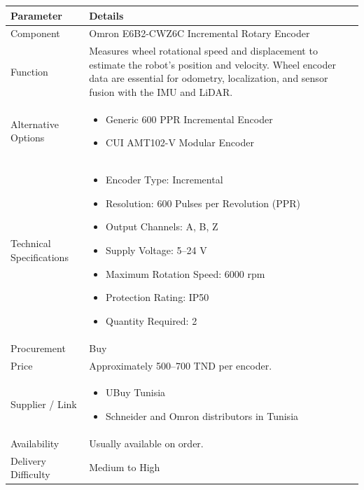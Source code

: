 \documentclass[12pt,a4paper]{article}
\begin{document}
\begin{longtable}{|p{4cm}|p{10cm}|}
\hline
\textbf{Parameter} & \textbf{Details} \\
\hline

Component &
Omron E6B2-CWZ6C Incremental Rotary Encoder \\
\hline

Function &
Measures wheel rotational speed and displacement to estimate the robot's position and velocity. Wheel encoder data are essential for odometry, localization, and sensor fusion with the IMU and LiDAR.\\
\hline


Alternative Options &
\begin{itemize}
\item Generic 600 PPR Incremental Encoder
\item CUI AMT102-V Modular Encoder
\end{itemize}
\\
\hline

Technical Specifications &
\begin{itemize}
\item Encoder Type: Incremental
\item Resolution: 600 Pulses per Revolution (PPR)
\item Output Channels: A, B, Z
\item Supply Voltage: 5--24 V
\item Maximum Rotation Speed: 6000 rpm
\item Protection Rating: IP50
\item Quantity Required: 2
\end{itemize}
\\
\hline

Procurement &
Buy \\
\hline

Price &
Approximately 500--700 TND per encoder. \\
\hline

Supplier / Link &
\begin{itemize}
\item UBuy Tunisia
\item Schneider and Omron distributors in Tunisia

\end{itemize}
\\
\hline

Availability &
Usually available on order. \\
\hline

Delivery Difficulty &
Medium to High \\
\hline


\end{longtable}
\end{document}
